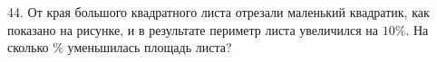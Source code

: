 44. От края большого квадратного листа отрезали маленький квадратик, как показано на рисунке, и в результате периметр листа увеличился на $10\%.$ На сколько $\%$ уменьшилась площадь листа?
\begin{figure}[h]
\end{figure}\\
